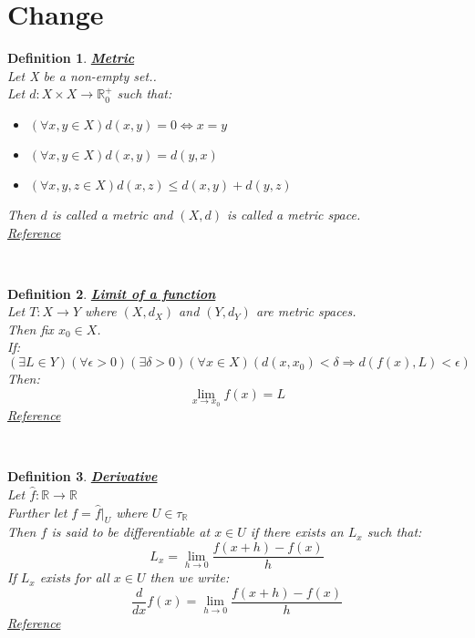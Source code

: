 \documentclass[12pt]{extarticle}
\theoremstyle{plain}
\theoremstyle{plain}
\theoremstyle{plain}
\theoremstyle{Definition}
\newtheorem{def.}{Definition}[section]
\theoremstyle{Definition}
\theoremstyle{plain}
\theoremstyle{plain}
\newcommand{\cut}[0]{\noindent\framebox[\linewidth]{\rule{\linewidth}{2pt}}\\}
\begin{document}
\section{Change}
\begin{def.} \underline{\textbf{Metric}} \\ 
	Let X be a non-empty set.. \\ 
	Let $d : X \times X \to \mathbb{R}^+_0$ such that: 
	\begin{itemize}
		\item $(\forall x,y \in X) d(x,y) = 0 \Leftrightarrow x = y$ 
		\item $(\forall x,y \in X) d(x,y) = d(y,x)$
		\item $(\forall x,y,z \in X) d(x,z) \leq d(x,y) + d(y,z)$
	\end{itemize}	
	Then $d$ is called a metric and $(X,d)$ is called a metric space. \\
	\href{https://en.wikipedia.org/wiki/Metric_space}{Reference}
\end{def.}
\cut
\begin{def.} \underline{\textbf{Limit of a function}} \\ 
	Let $T : X \to Y$ where $(X,d_X)$ and $(Y,d_Y)$ are metric spaces. \\ 
	Then fix $x_0 \in X$. \\
	If:
	$$(\exists L \in Y)( \forall \epsilon > 0 )(\exists \delta > 0)(\forall x \in X)(d(x,x_0) < \delta \Rightarrow d(f(x),L) < \epsilon)$$
	Then: $$\lim_{x \to x_0} f(x) = L$$ 
	\href{https://en.wikipedia.org/wiki/Limit_of_a_function}{Reference}
\end{def.}
\cut
\begin{def.} \underline{\textbf{Derivative}} \\ 
	Let $\hat{f} : \mathbb{R} \to \mathbb{R}$ \\ 
	Further let $f = \hat{f}|_U$ where $U \in \tau_\mathbb{R}$ \\ 
	Then $f$ is said to be differentiable at $x \in U$ if there exists an $L_x$ such that: \\ 
	$$L_x = \lim_{h \to 0} \frac{f(x + h) - f(x)}{h}$$
	If $L_x$ exists for all $x \in U$ then we write: \\ 
	$$\frac{d}{dx}f(x) = \lim_{h \to 0} \frac{f(x + h) - f(x)}{h}$$
	\href{https://en.wikipedia.org/wiki/Differentiable_function}{Reference}
\end{def.}
\cut
\end{document}

